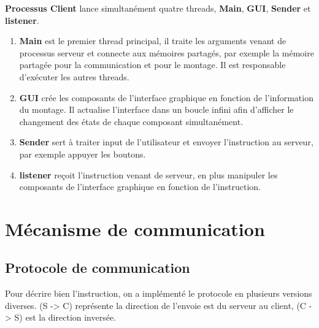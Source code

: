\documentclass[14px]{article}
\begin{document}
	\textbf{Processus Client} lance simultanément quatre threads, \textbf{Main}, \textbf{GUI}, \textbf{Sender} et \textbf{listener}.
	\begin{enumerate}
		\item \textbf{Main} est le premier thread principal, il traite les arguments venant de processus serveur et connecte aux mémoires partagés, par exemple la mémoire partagée pour la communication et pour le montage. Il est responsable d'exécuter les autres threads.
		\item \textbf{GUI} crée les composants de l'interface graphique en fonction de l'information du montage. Il actualise l'interface dans un boucle infini afin d'afficher le changement des états de chaque composant simultanément.
		\item \textbf{Sender} sert à traiter input de l'utilisateur et envoyer l'instruction au serveur, par exemple appuyer les boutons.
		\item \textbf{listener} reçoit l'instruction venant de serveur, en plus manipuler les composants de l'interface graphique en fonction de l'instruction.
	\end{enumerate}


	\pagestyle{fancy}
	\rhead{\thepage}
	\fancyfoot{}

	\section{Mécanisme de communication}
	\subsection{Protocole de communication}
	Pour décrire bien l'instruction, on a implémenté le protocole en plusieurs versions diverses. (S -> C) représente la direction de l'envoie est du serveur au client, (C -> S) est la direction inversée.
\end{document}
